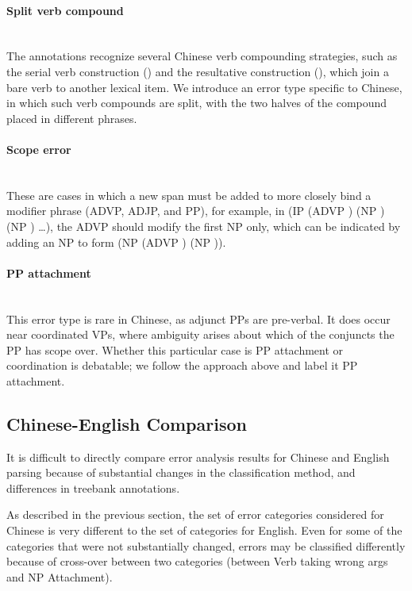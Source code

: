 \paragraph{Split verb compound} \strut \\
The \pctb annotations recognize several
Chinese verb compounding strategies, such as the serial verb construction
(\mbox{}) and the resultative construction
(\mbox{}), which join a bare verb to another
lexical item.  We introduce an error type specific to Chinese, in which such
verb compounds are split, with the two halves of the compound placed in
different phrases.

\paragraph{Scope error} \strut \\
These are cases in which a new span must be added to more closely bind a modifier phrase (ADVP, ADJP, and PP), for example, in 
(IP (ADVP \mbox{}) (NP \mbox{}) (NP \mbox{}) \ldots), the ADVP should modify the first NP only, which can be indicated by adding an NP to form (NP (ADVP \mbox{}) (NP \mbox{})).

\paragraph{PP attachment} \strut \\
This error type is rare in Chinese, as adjunct PPs are pre-verbal.  It does
occur near coordinated VPs, where ambiguity arises about which of the conjuncts
the PP has scope over.  Whether this particular case is PP attachment or
coordination is debatable; we follow the approach above and
label it PP attachment.

\subsection{Chinese-English Comparison} \label{subsec:chinese_english_comparison}

It is difficult to directly compare error analysis results for Chinese and
English parsing because of substantial changes in the classification method,
and differences in treebank annotations.

As described in the previous section, the set of error categories considered for Chinese is very different to the set of categories for English.  
Even for some of the categories that were not substantially changed, errors may be classified differently because of cross-over between two categories (\myeg between Verb taking wrong args and NP Attachment).

